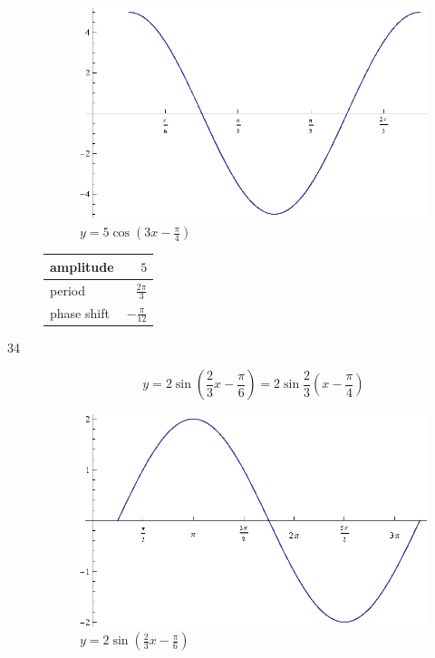 \documentclass{exam}
\begin{document}
\begin{description}
        \begin{figure}[H]
          \centering
          \includegraphics[scale=0.8]{exercise33.eps}
          \caption{$y = 5 \cos \left( 3x - \frac{\pi}{4} \right)$}
        \end{figure}

        \begin{tabular}[H]{lr}
          \toprule
          amplitude & $5$ \\
          \midrule
          period & $\frac{2 \pi}{3}$ \\
          \midrule
          phase shift & $- \frac{\pi}{12}$ \\
          \bottomrule
        \end{tabular}

      \pagebreak

      \item[34]
        \[
          y = 2 \sin \left( \frac{2}{3} x - \frac{\pi}{6} \right) = 2 \sin \frac{2}{3} \left( x - \frac{\pi}{4} \right)
        \]

        \begin{figure}[H]
          \centering
          \includegraphics[scale=1.0]{exercise34.eps}
          \caption{$y = 2 \sin \left( \frac{2}{3} x - \frac{\pi}{6} \right)$}
        \end{figure}


\end{description}
\end{document}
